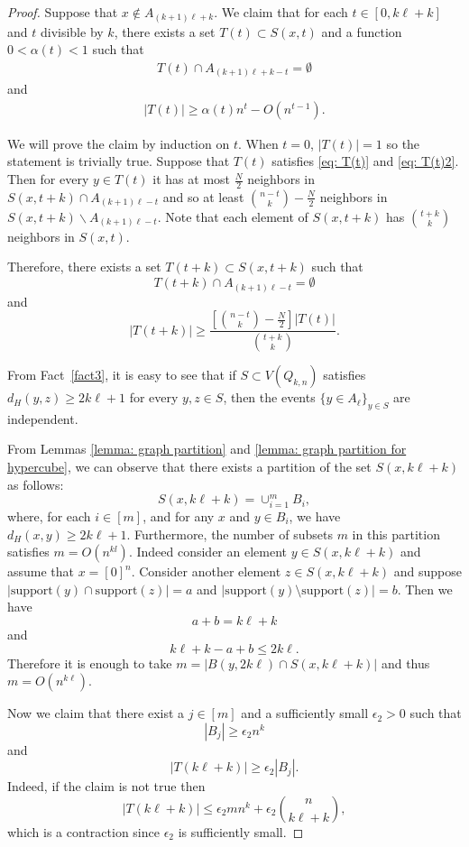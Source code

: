 \documentclass[reqno,11pt]{amsart}
\renewcommand{\leq}{\leqslant}
\renewcommand{\geq}{\geqslant}
\begin{document}
\begin{proof} Suppose that $x \notin A_{(k+1)\ell+k}$. We claim that for each $t \in [0,k\ell+k]$ and $t$ divisible by $k$, there exists a set $T(t) \subset S(x,t)$ and a function $ 0< \alpha(t) < 1$ such that 
\begin{align} \label{eq: T(t)}
T(t) \cap A_{(k+1)\ell+k-t}=\emptyset
\end{align}
 and 
 \begin{align} \label{eq: T(t)2}
     |T(t)|\geq \alpha(t) n^t-O(n^{t-1}).
 \end{align}

We will prove the claim by induction on $t$. When $t=0$, $|T(t)|=1$ so the statement is trivially true. Suppose that $T(t)$ satisfies \ref{eq: T(t)} and \ref{eq: T(t)2}. Then for every $y \in T(t)$ it has at most $\frac{N}{2}$ neighbors in $S(x,t+k) \cap A_{(k+1)\ell-t}$ and so at least $\binom{n-t}{k}-\frac{N}{2}$ neighbors in $S(x,t+k) \backslash A_{(k+1)\ell-t}$. Note that each element of $S(x,t+k)$ has $\binom{t+k}{k}$ neighbors in $S(x,t)$.

Therefore, there exists a set $T(t+k) \subset S(x,t+k)$ such that $$T(t+k) \cap A_{(k+1)\ell-t}=\emptyset$$ and 
$$|T(t+k)| \geq \frac{[\binom{n-t}{k}-\frac{N}{2}] |T(t)|}{\binom{t+k}{k}}.$$

From Fact~\ref{fact3}, it is easy to see that if $S \subset V(Q_{k,n})$ satisfies $d_H(y,z) \geq 2k\ell+1$ for every $y,z \in S$, then the events $\{y \in A_{\ell}\}_{y \in S}$ are independent.

From Lemmas \ref{lemma: graph partition} and \ref{lemma: graph partition for hypercube}, we can observe that there exists a partition of the set $S(x,k\ell+k)$ as follows:
$$S(x,k\ell+k)= \cup_{i=1}^m B_i,$$
where, for each $i \in [m]$, and for any $x$ and $y \in B_i$, we have $d_H(x,y) \geq 2k\ell+1$. Furthermore, the number of subsets $m$ in this partition satisfies $m =O(n^{kl})$. Indeed consider an element $y \in S(x,k\ell+k)$ and assume that $x=[0]^n$. Consider another element $z \in S(x,k\ell+k)$ and suppose $|\text{support}(y) \cap \text{support}(z)|=a$ and $|\text{support}(y) \setminus \text{support}(z)|=b$. Then we have 
$$a+b=k\ell+k$$ and 
$$k\ell+k-a+b \leq 2k\ell.$$
Therefore it is enough to take $m= |B(y,2k\ell) \cap S(x,k\ell+k)|$ and thus $m= O(n^{k\ell})$.


Now we claim that there exist a $j \in [m]$ and a sufficiently small $\epsilon_2 >0$ such that 
$$|B_j| \geq \epsilon_2 n^k$$ and 
$$|T(k\ell+k)| \geq \epsilon_2|B_j|.$$
Indeed, if the claim is not true then 
$$|T(k\ell+k)| \leq \epsilon_2 mn^k+ \epsilon_2 \binom{n}{k\ell+k},$$ which is a contraction since $\epsilon_2 $ is sufficiently small.


\end{proof}
\end{document}
